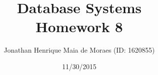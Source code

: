 \title{Database Systems \\ Homework 8}
\author{Jonathan Henrique Maia de Moraes (ID: 1620855)}
\date{11/30/2015}
\maketitle
